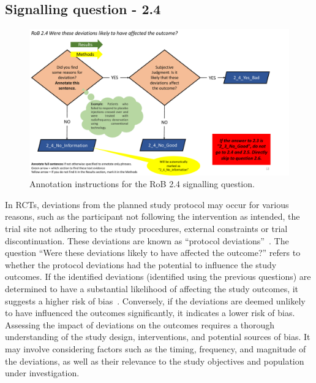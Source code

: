 \documentclass[sn-mathphys,Numbered]{sn-jnl}%
\begin{document}
\subsection*{Signalling question - 2.4 }
\label{subsec:2_4}
%
%
%
\begin{figure}[hbt]
    \centering
    \includegraphics[width=\textwidth]{figures/2_4.pdf}
    \caption{Annotation instructions for the RoB 2.4 signalling question.}
    \label{fig:2_4}
\end{figure}
%
%
%
In RCTs, deviations from the planned study protocol may occur for various reasons, such as the participant not following the intervention as intended, the trial site not adhering to the study procedures, external constraints or trial discontinuation.
These deviations are known as ``protocol deviations''~\cite{folayan2019challenges,merli2020immediate}.
The question ``Were these deviations likely to have affected the outcome?'' refers to whether the protocol deviations had the potential to influence the study outcomes.
If the identified deviations (identified using the previous questions) are determined to have a substantial likelihood of affecting the study outcomes, it suggests a higher risk of bias~\cite{dodd2012nonadherence}. 
Conversely, if the deviations are deemed unlikely to have influenced the outcomes significantly, it indicates a lower risk of bias.
Assessing the impact of deviations on the outcomes requires a thorough understanding of the study design, interventions, and potential sources of bias.
It may involve considering factors such as the timing, frequency, and magnitude of the deviations, as well as their relevance to the study objectives and population under investigation.
\end{document}
